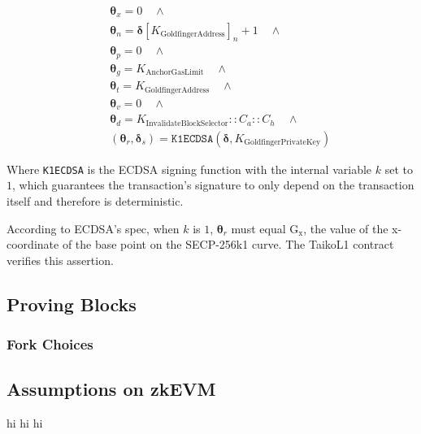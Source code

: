 \documentclass[9pt,oneside]{amsart}
\begin{document}
\begin{multicols}{2}
\begin{eqnarray}
& & \boldsymbol{\theta}_x = 0 \quad \wedge \\
\nonumber& & \boldsymbol{\theta}_n = \boldsymbol{\delta}[K_{\mathrm{GoldfingerAddress}}]_n + 1 \quad \wedge \\
\nonumber& & \boldsymbol{\theta}_p = 0 \quad \wedge \\
\nonumber& & \boldsymbol{\theta}_g = K_{\mathrm{AnchorGasLimit}} \quad \wedge \\
\nonumber& & \boldsymbol{\theta}_t = K_{\mathrm{GoldfingerAddress}} \quad \wedge  \\
\nonumber& & \boldsymbol{\theta}_v = 0 \quad \wedge  \\
\nonumber& & \boldsymbol{\theta}_d = K_{\mathrm{InvalidateBlockSelector}}::C_a::C_h \quad \wedge  \\
\nonumber& & (\boldsymbol{\theta}_r,\boldsymbol{\delta}_s) = \texttt{K1ECDSA}(\boldsymbol{\delta}, K_{\mathrm{GoldfingerPrivateKey}})
\end{eqnarray}

Where \texttt{K1ECDSA} is the ECDSA signing function with the internal variable $k$ set to $1$, which guarantees the transaction's signature to only depend on the transaction itself and therefore is deterministic.

According to ECDSA's spec, when $k$ is $1$, $\boldsymbol{\theta}_r$ must equal $\mathrm{G_x}$, the value of the x-coordinate of the base point on the SECP-256k1 curve. The TaikoL1 contract verifies this assertion.





\subsection{Proving Blocks} \label{sec:proving}





\subsubsection{Fork Choices} \label{sec:forkchoices}






\subsection{Assumptions on zkEVM}
hi hi hi






\end{multicols}
\end{document}
